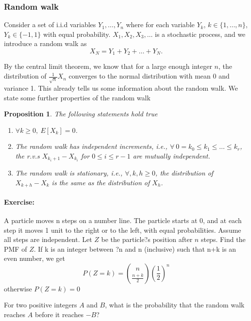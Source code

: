\documentclass[12pt,a4paper]{article}
\newtheorem{proposition}{Proposition}
\begin{document}
\subsubsection{Random walk}
Consider a set of i.i.d variables $Y_1,\ldots, Y_n$ where for each variable $Y_k$, $k\in\{1,\ldots, n\}$, $Y_k\in\{-1,1\}$ with equal probability. $X_1,X_2,X_3,\ldots$ is a stochastic process, and we introduce a random walk as 
\begin{equation}
	X_N = Y_1+Y_2+\ldots+ Y_N. 
\end{equation}

By the central limit theorem, we know that for a large enough integer $n$, the
distribution of $\frac{1}{\sqrt{n}} X_n$ converges to the normal distribution with mean 0 and
variance 1. This already tells us some information about the random walk.
We state some further properties of the random walk

\begin{proposition}
	The following statements hold true
	\begin{enumerate}
	\item $\forall k\geq 0, \ E[X_k] = 0$.
	\item The random walk has independent increments, i.e., $\forall\ 0 = k_0 \leq k_1 \leq\ldots\leq k_r$, the r.v.s $X_{k_i+1}-X_{k_i}$ for $0 \leq i \leq r-1$ are mutually independent.
	\item The random walk is stationary, i.e., $\forall, k,h\geq 0$, the distribution of $X_{k+h}-X_k$ is the same as the distribution of $X_h$.	
	\end{enumerate}
	\end{proposition}
	
\paragraph{Exercise:} A particle moves n steps on a number line. 
	The particle starts at 0, and at each step it moves 1 unit to the right or to the left, with equal probabilities. 
	Assume all steps are independent. 
	Let $Z$ be the particle?s position after $n$ steps. Find the PMF of $Z$. If k is an integer between ?n and n (inclusive) such that n+k is an even number, we get
	$$ P(Z = k) = \binom{n}{\frac{n+k}{2}}\left(\frac{1}{2}\right)^n$$
	otherwise $ P(Z = k) = 0$
	
	For two positive integers $A$ and $B$, what is the probability that the random walk reaches $A$ before it reaches $-B$?
	
\end{document}
